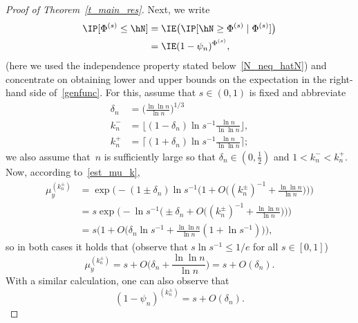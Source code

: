 \begin{proof}[Proof of Theorem~\ref{t_main_res}]
Next, we write
\begin{align}
\IP[\Phi^{(s)}\leq \hN] &= \IE \big(\IP[\hN \geq \Phi^{(s)}\mid\Phi^{(s)}]\big)\nonumber \\
&=\IE (1-\psi_n)^{\Phi^{(s)}},\label{genfunc}
\end{align}
(here we used the independence property stated below~\eqref{N_neq_hatN}) and concentrate on obtaining lower and upper bounds on the expectation in the right-hand side of~\eqref{genfunc}. For this, assume that $s\in(0,1)$ is fixed and abbreviate
\begin{align*}
\delta_n &= \Big(\frac{\ln\ln n}{\ln n}\Big)^{1/3}\\
k_n^{-} &= \Big\lfloor(1-\delta_n)\ln s^{-1} \frac{\ln n}{\ln\ln n}
\Big\rfloor,\\
k_n^{+} &= \Big\lceil(1+\delta_n)\ln s^{-1} \frac{\ln n}{\ln\ln n}
\Big\rceil;
\end{align*}
we also assume that~$n$ is sufficiently large so that $\delta_n \in(0,\frac{1}{2})$ and $1<k_n^{-}<k_n^{+}$. Now, according to~\eqref{est_mu_k},
\begin{align*}
\mu_y^{(k_n^{\pm})} &= \exp\Big(-(1\pm \delta_n)\ln s^{-1}
\Big(1+O\Big((k_n^{\pm})^{-1}+\frac{\ln\ln n}{\ln n}\Big)\Big)\Big)\\
& = s \exp\Big(-\ln s^{-1}
\Big(\pm \delta_n+O\Big((k_n^{\pm})^{-1}+\frac{\ln\ln n}{\ln n}\Big)\Big)\Big)\\
& = s \Big(1+O\Big(\delta_n\ln s^{-1} + \frac{\ln\ln n}{\ln n}(1+\ln s^{-1})\Big)\Big),
\end{align*}
so in both cases it holds that (observe that $s\ln s^{-1}\leq 1/e$ for all $s\in[0,1]$)
\begin{equation}\label{muk_ourcase}
\mu_y^{(k_n^{\pm})} = s + O\Big(\delta_n +\frac{\ln\ln n}{\ln n} \Big) = s + O(\delta_n).
\end{equation}
With a similar calculation, one can also observe that
\begin{equation}\label{1-psi_ourcase}
(1-\psi_n)^{(k_n^{\pm})} = s + O(\delta_n).
\end{equation}


\end{proof}
